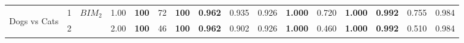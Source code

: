 \begin{table}[tph]
\begin{adjustbox}{angle=90}
{\begin{tabular}{c|c|cc|ccc|ccc|ccc|ccc}
                \\
                \hline
                \multirow{5}{*}{\begin{turn}{90}Dogs vs Cats\end{turn}} & 1
                                                                        & \multirow{3}{*}{$BIM_{2}$}     & 1.00 &
                \textbf{100}
                                                                        & 72                             &
                \textbf{100}
                                                                        &
                \textbf{0.962}
                                                                        & 0.935
                                                                        & 0.926
                                                                        &
                \textbf{1.000}
                                                                        & 0.720
                                                                        &
                \textbf{1.000}
                                                                        &
                \textbf{0.992}
                                                                        & 0.755
                                                                        & 0.984
                \\
                                                                        & 2
                                                                        &
                                                                        & 2.00                           &
                \textbf{100}
                                                                        & 46
                                                                        &
                \textbf{100}
                                                                        &
                \textbf{0.962}
                                                                        & 0.902
                                                                        & 0.926                          &
                \textbf{1.000}
                                                                        & 0.460
                                                                        &
                \textbf{1.000}
                                                                        &
                \textbf{0.992}
                                                                        & 0.510
                                                                        & 0.984

\end{tabular}}
\end{adjustbox}
\end{table}
